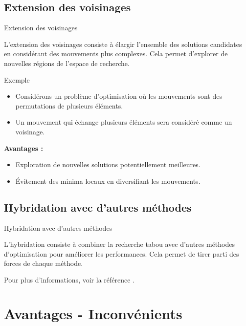 \documentclass{beamer}
\begin{document}
\subsection{Extension des voisinages}
\begin{frame}{Extension des voisinages}
    \begin{definition}
        L'extension des voisinages consiste à élargir l'ensemble des solutions candidates en considérant des mouvements plus complexes. Cela permet d'explorer de nouvelles régions de l'espace de recherche.
    \end{definition}
    \bigskip

    \begin{exampleblock}{Exemple}
        \begin{itemize}
            \item Considérons un problème d'optimisation où les mouvements sont des permutations
                  de plusieurs éléments.
            \item Un mouvement qui échange plusieurs éléments sera considéré comme un voisinage.
        \end{itemize}
    \end{exampleblock}
    \bigskip
    \textbf{Avantages :}
    \begin{itemize}
        \item Exploration de nouvelles solutions potentiellement meilleures.
        \item Évitement des minima locaux en diversifiant les mouvements.
    \end{itemize}
\end{frame}

\subsection{Hybridation avec d'autres méthodes}
\begin{frame}{Hybridation avec d'autres méthodes}
    \begin{definition} L'hybridation consiste à combiner la recherche tabou avec d'autres méthodes d'optimisation pour améliorer les performances. Cela permet de tirer parti des forces de chaque méthode.
    \end{definition}
    \bigskip

    Pour plus d'informations, voir la référence \cite{ref1}.
\end{frame}

\section{Avantages - Inconvénients}
\end{document}
